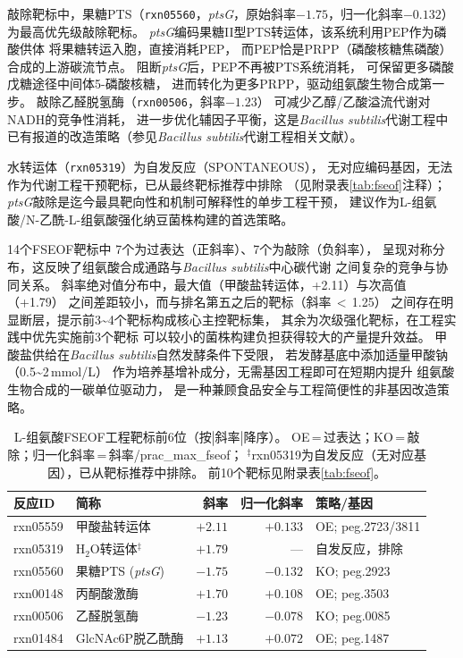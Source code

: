 \documentclass[10pt, a4paper, twocolumn]{ctexart}
\newcommand{\bs}{\textit{Bacillus subtilis}}
\newcommand{\NAH}{N-乙酰-L-组氨酸}
\begin{document}
敲除靶标中，果糖PTS（\texttt{rxn05560}，\textit{ptsG}，原始斜率$-1.75$，归一化斜率$-0.132$）
为最高优先级敲除靶标。
\textit{ptsG}编码果糖II型PTS转运体，该系统利用PEP作为磷酸供体
将果糖转运入胞，直接消耗PEP，
而PEP恰是PRPP（磷酸核糖焦磷酸）合成的上游碳流节点。
阻断\textit{ptsG}后，PEP不再被PTS系统消耗，
可保留更多磷酸戊糖途径中间体5-磷酸核糖，
进而转化为更多PRPP，驱动组氨酸生物合成第一步。
敲除乙醛脱氢酶（\texttt{rxn00506}，斜率$-1.23$）
可减少乙醇/乙酸溢流代谢对NADH的竞争性消耗，
进一步优化辅因子平衡，这是\bs{}代谢工程中
已有报道的改造策略（参见\bs{}代谢工程相关文献）。

水转运体（\texttt{rxn05319}）为自发反应（SPONTANEOUS），
无对应编码基因，无法作为代谢工程干预靶标，已从最终靶标推荐中排除
（见附录表\ref{tab:fseof}注释）；
\textit{ptsG}敲除是迄今最具靶向性和机制可解释性的单步工程干预，
建议作为L-组氨酸/\NAH{}强化纳豆菌株构建的首选策略。

14个FSEOF靶标中
7个为过表达（正斜率）、7个为敲除（负斜率），
呈现对称分布，这反映了组氨酸合成通路与\bs{}中心碳代谢
之间复杂的竞争与协同关系。
斜率绝对值分布中，最大值（甲酸盐转运体，+2.11）与次高值（+1.79）
之间差距较小，而与排名第五之后的靶标（斜率\,$<$\,1.25）
之间存在明显断层，提示前3\textasciitilde4个靶标构成核心主控靶标集，
其余为次级强化靶标，在工程实践中优先实施前3个靶标
可以较小的菌株构建负担获得较大的产量提升效益。
甲酸盐供给在\bs{}自然发酵条件下受限，
若发酵基底中添加适量甲酸钠（0.5\textasciitilde2\,mmol/L）
作为培养基增补成分，无需基因工程即可在短期内提升
组氨酸生物合成的一碳单位驱动力，
是一种兼顾食品安全与工程简便性的非基因改造策略。

\begin{table}[t]
\caption{L-组氨酸FSEOF工程靶标前6位（按$|\text{斜率}|$降序）。
  OE\,=\,过表达；KO\,=\,敲除；归一化斜率\,=\,斜率/prac\_max\_fseof；
  $^\ddagger$rxn05319为自发反应（无对应基因），已从靶标推荐中排除。
  前10个靶标见附录表\ref{tab:fseof}。}
\label{tab:fseof_main}
\small
\centering
\begin{tabular}{llrrl}
\toprule
\textbf{反应ID} & \textbf{简称} & \textbf{斜率} & \textbf{归一化斜率} & \textbf{策略/基因} \\
\midrule
rxn05559 & 甲酸盐转运体          & $+2.11$ & $+0.133$ & OE; peg.2723/3811 \\
rxn05319 & H$_2$O转运体$^\ddagger$ & $+1.79$ & —        & 自发反应，排除 \\
rxn05560 & 果糖PTS (\textit{ptsG}) & $-1.75$ & $-0.132$ & KO; peg.2923 \\
rxn00148 & 丙酮酸激酶            & $+1.70$ & $+0.108$ & OE; peg.3503 \\
rxn00506 & 乙醛脱氢酶            & $-1.23$ & $-0.078$ & KO; peg.0085 \\
rxn01484 & GlcNAc6P脱乙酰酶     & $+1.13$ & $+0.072$ & OE; peg.1487 \\
\bottomrule
\end{tabular}
\end{table}
\end{document}
